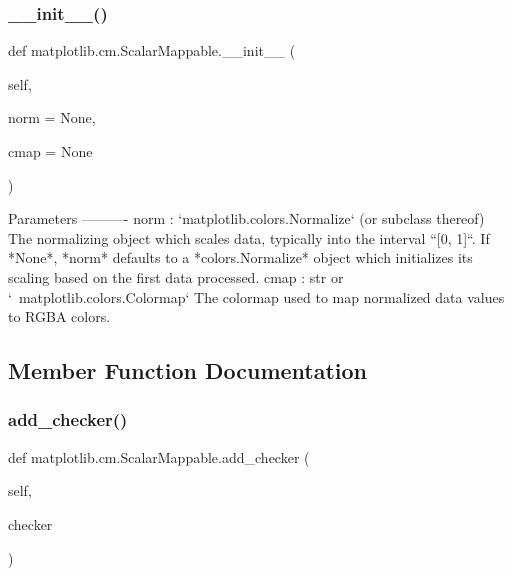 \subsubsection{\texorpdfstring{\+\_\+\+\_\+init\+\_\+\+\_\+()}{\_\_init\_\_()}}
{\footnotesize\ttfamily def matplotlib.\+cm.\+Scalar\+Mappable.\+\_\+\+\_\+init\+\_\+\+\_\+ (\begin{DoxyParamCaption}\item[{}]{self,  }\item[{}]{norm = {\ttfamily None},  }\item[{}]{cmap = {\ttfamily None} }\end{DoxyParamCaption})}

\begin{DoxyVerb}Parameters
----------
norm : `matplotlib.colors.Normalize` (or subclass thereof)
    The normalizing object which scales data, typically into the
    interval ``[0, 1]``.
    If *None*, *norm* defaults to a *colors.Normalize* object which
    initializes its scaling based on the first data processed.
cmap : str or `~matplotlib.colors.Colormap`
    The colormap used to map normalized data values to RGBA colors.
\end{DoxyVerb}
 

\subsection{Member Function Documentation}
\mbox{\label{classmatplotlib_1_1cm_1_1ScalarMappable_aff711b5bd3781f1cc62380885c4b8111}} 
\subsubsection{\texorpdfstring{add\+\_\+checker()}{add\_checker()}}
{\footnotesize\ttfamily def matplotlib.\+cm.\+Scalar\+Mappable.\+add\+\_\+checker (\begin{DoxyParamCaption}\item[{}]{self,  }\item[{}]{checker }\end{DoxyParamCaption})}

\mbox{\label{classmatplotlib_1_1cm_1_1ScalarMappable_a077e84aff29d91e330cd48faa4325502}} 
